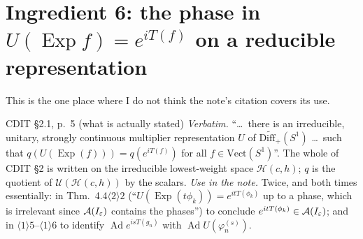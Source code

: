 \documentclass[11pt]{article}
\newcommand{\Hil}{\mathcal H}
\newcommand{\Diff}{\mathrm{Diff}_+}
\newcommand{\Ad}{\operatorname{Ad}}
\newcommand{\Exp}{\operatorname{Exp}}
\begin{document}
\section{Ingredient 6: the phase in $U(\Exp f)=e^{iT(f)}$ on a reducible representation}\label{sec:phase}

This is the one place where I do not think the note's citation covers its use.

\begin{citedbox}{CDIT \S2.1, p.~5 (what is actually stated)}
\emph{Verbatim.}  ``\dots\ there is an irreducible, unitary, strongly continuous multiplier representation $U$
of $\widetilde{\Diff}(S^1)$ \dots\ such that $q(U(\Exp(f)))=q(e^{iT(f)})$ for all $f\in\mathrm{Vect}(S^1)$''.
The whole of CDIT \S2 is written on the irreducible lowest-weight space $\Hil(c,h)$; $q$ is the quotient of
$\mathcal U(\Hil(c,h))$ by the scalars.
\emph{Use in the note.}  Twice, and both times essentially:
in Thm.~4.4$\langle2\rangle2$ (``$U(\Exp(t\phi_k))=e^{itT(\phi_k)}$ up to a phase, which is irrelevant since
$\mathcal A(I_\varepsilon)$ contains the phases'') to conclude $e^{itT(\phi_k)}\in\mathcal A(I_\varepsilon)$; and in
$\langle1\rangle5$--$\langle1\rangle6$ to identify $\Ad e^{isT(g_n)}$ with $\Ad U(\varphi^{(s)}_n)$.
\end{citedbox}
\end{document}
